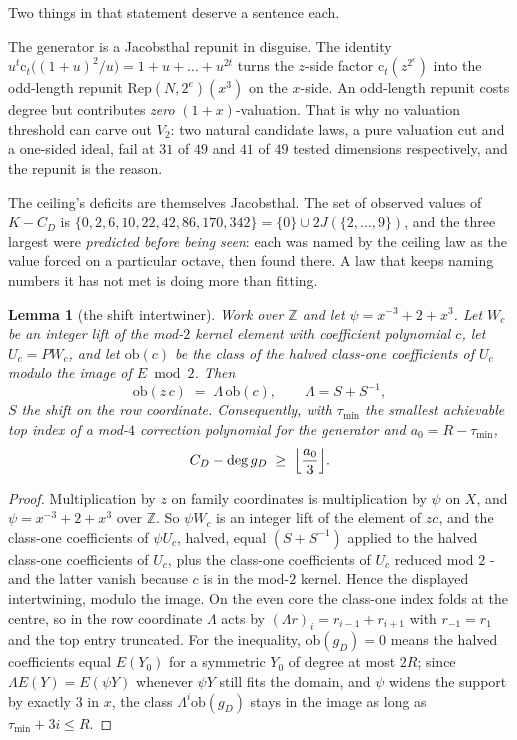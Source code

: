 \documentclass[11pt]{amsart}
\newtheorem{lemma}[theorem]{Lemma}
\theoremstyle{definition}
\theoremstyle{remark}
\begin{document}
Two things in that statement deserve a sentence each.

The generator is a Jacobsthal repunit in disguise. The identity $u^t \mathrm{c}_t\bigl((1+u)^2/u\bigr) = 1 + u + \dots + u^{2t}$ turns the $z$-side factor $\mathrm{c}_t(z^{2^e})$ into the odd-length repunit $\mathrm{Rep}(N, 2^e)(x^3)$ on the $x$-side. An odd-length repunit costs degree but contributes \emph{zero} $(1+x)$-valuation. That is why no valuation threshold can carve out $V_2$: two natural candidate laws, a pure valuation cut and a one-sided ideal, fail at $31$ of $49$ and $41$ of $49$ tested dimensions respectively, and the repunit is the reason.

The ceiling's deficits are themselves Jacobsthal. The set of observed values of $K - C_D$ is $\{0, 2, 6, 10, 22, 42, 86, 170, 342\} = \{0\} \cup 2J(\{2,\dots,9\})$, and the three largest were \emph{predicted before being seen}: each was named by the ceiling law as the value forced on a particular octave, then found there. A law that keeps naming numbers it has not met is doing more than fitting.

\begin{lemma}[the shift intertwiner]
\label{b:lem:shift}
Work over $\mathbb{Z}$ and let $\psi = x^{-3} + 2 + x^3$. Let $W_c$ be an integer lift of the mod-$2$ kernel element with coefficient polynomial $c$, let $U_c = P W_c$, and let $\mathrm{ob}(c)$ be the class of the halved class-one coefficients of $U_c$ modulo the image of $E \bmod 2$. Then
\[
  \mathrm{ob}(z\,c) \;=\; \Lambda\,\mathrm{ob}(c), \qquad \Lambda = S + S^{-1},
\]
$S$ the shift on the row coordinate. Consequently, with $\tau_{\min}$ the smallest achievable top index of a mod-$4$ correction polynomial for the generator and $a_0 = R - \tau_{\min}$,
\[
  C_D - \deg g_D \;\ge\; \Bigl\lfloor \frac{a_0}{3} \Bigr\rfloor .
\]
\end{lemma}

\begin{proof}
Multiplication by $z$ on family coordinates is multiplication by $\psi$ on $X$, and $\psi = x^{-3}+2+x^3$ over $\mathbb{Z}$. So $\psi W_c$ is an integer lift of the element of $zc$, and the class-one coefficients of $\psi U_c$, halved, equal $(S+S^{-1})$ applied to the halved class-one coefficients of $U_c$, plus the class-one coefficients of $U_c$ reduced mod $2$ - and the latter vanish because $c$ is in the mod-$2$ kernel. Hence the displayed intertwining, modulo the image. On the even core the class-one index folds at the centre, so in the row coordinate $\Lambda$ acts by $(\Lambda r)_i = r_{i-1} + r_{i+1}$ with $r_{-1} = r_1$ and the top entry truncated. For the inequality, $\mathrm{ob}(g_D) = 0$ means the halved coefficients equal $E(Y_0)$ for a symmetric $Y_0$ of degree at most $2R$; since $\Lambda E(Y) = E(\psi Y)$ whenever $\psi Y$ still fits the domain, and $\psi$ widens the support by exactly $3$ in $x$, the class $\Lambda^i \mathrm{ob}(g_D)$ stays in the image as long as $\tau_{\min} + 3i \le R$.
\end{proof}
\end{document}

